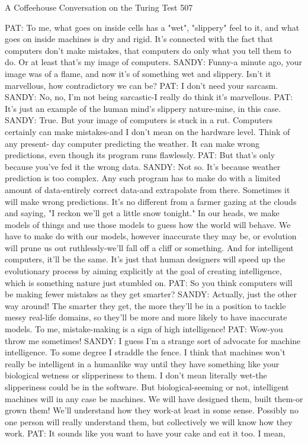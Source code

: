 A Coffeehouse Conversation on the Turing Test                                     507

PAT: To me, what goes on inside cells has a "wet", "slippery" feel to it, and what
   goes on inside machines is dry and rigid. It's connected with the fact that
   computers don't make mistakes, that computers do only what you tell them to do.
   Or at least that's my image of computers.
SANDY: Funny-a minute ago, your image was of a flame, and now it's of something
   wet and slippery. Isn't it marvellous, how contradictory we can be?
PAT: I don't need your sarcasm.
SANDY: No, no, I'm not being sarcastic-I really do think it's marvellous. PAT: It's
   just an example of the human mind's slippery nature-mine, in this case.
SANDY: True. But your image of computers is stuck in a rut. Computers certainly
   can make mistakes-and I don't mean on the hardware level. Think of any present-
   day computer predicting the weather. It can make wrong predictions, even
   though its program runs flawlessly.
PAT: But that's only because you've fed it the wrong data.
SANDY: Not so. It's because weather prediction is too complex. Any such program
   has to make do with a limited amount of data-entirely correct data-and
   extrapolate from there. Sometimes it will make wrong predictions. It's no
   different from a farmer gazing at the clouds and saying, "I reckon we'll get a little
   snow tonight." In our heads, we make models of things and use those models to
   guess how the world will behave. We have to make do with our models, however
   inaccurate they may be, or evolution will prune us out ruthlessly-we'll fall off a
   cliff or something. And for intelligent computers, it'll be the same. It's just that
   human designers will speed up the evolutionary process by aiming explicitly at
   the goal of creating intelligence, which is something nature just stumbled on.
PAT: So you think computers will be making fewer mistakes as they get smarter?
SANDY: Actually, just the other way around! The smarter they get, the more they'll
   be in a position to tackle messy real-life domains, so they'll be more and more
   likely to have inaccurate models. To me, mistake-making is a sign of high
   intelligence!
PAT: Wow-you throw me sometimes!
SANDY: I guess I'm a strange sort of advocate for machine intelligence. To some
   degree I straddle the fence. I think that machines won't really be intelligent in a
   humanlike way until they have something like your biological wetness or
   slipperiness to them. I don't mean literally wet-the slipperiness could be in the
   software. But biological-seeming or not, intelligent machines will in any case be
   machines. We will have designed them, built them-or grown them! We'll
   understand how they work-at least in some sense. Possibly no one person will
   really understand them, but collectively we will know how they work.
PAT: It sounds like you want to have your cake and eat it too. I mean,




